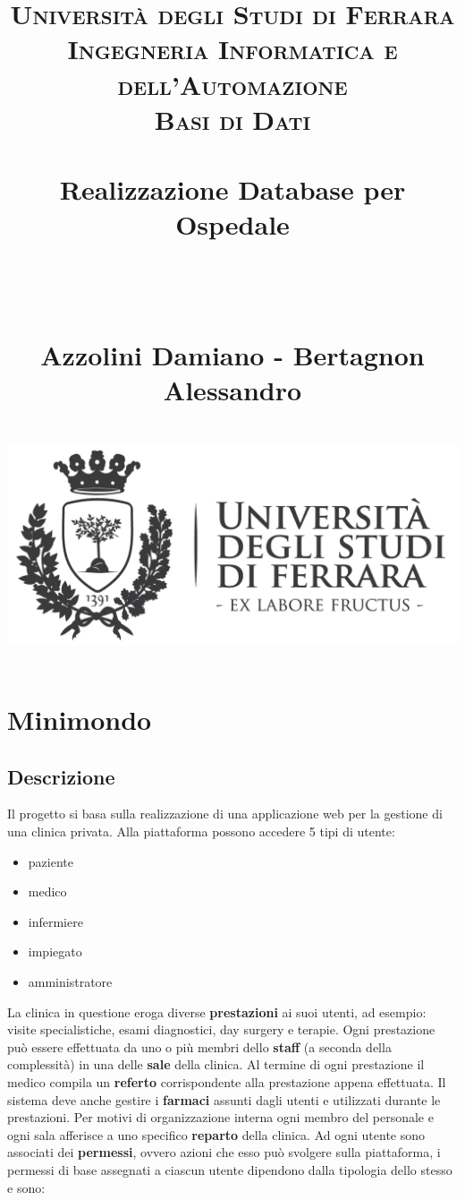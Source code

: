 \documentclass[paper=a4, fontsize=11pt,x11names]{report}
\title{
		\usefont{OT1}{bch}{b}{n}
		\normalfont \normalsize \textsc{Universit\`a degli Studi di Ferrara \\ Ingegneria Informatica e dell'Automazione
			\\ Basi di Dati} \\ [25pt]
		\horrule{0.5pt} \\[0.4cm]
		\Huge Realizzazione Database per Ospedale \date{}\\%
		\horrule{0.5pt} \\[0.4cm]
		\LARGE Azzolini Damiano - Bertagnon Alessandro \\ [0.4cm]
		\horrule{2pt} \\[0.8cm]
		\includegraphics{logoUnife}
}
\begin{document}
\maketitle

\newpage

\tableofcontents
\thispagestyle{empty}



\newpage





\chapter{Minimondo}
\section{Descrizione}
Il progetto si basa sulla realizzazione di una applicazione web per la gestione di una clinica privata. Alla piattaforma possono accedere 5 tipi di utente:
\begin{itemize}
\item paziente
\item medico
\item infermiere
\item impiegato
\item amministratore
\end{itemize}  

La clinica in questione eroga diverse \textbf{prestazioni} ai suoi utenti, ad esempio: visite specialistiche, esami diagnostici, day surgery e terapie. Ogni prestazione può essere effettuata da uno o più membri dello \textbf{staff} (a seconda della complessità) in una delle \textbf{sale} della clinica. Al termine di ogni prestazione il medico compila un \textbf{referto} corrispondente alla prestazione appena effettuata. Il sistema deve anche gestire i \textbf{farmaci} assunti dagli utenti e utilizzati durante le prestazioni. Per motivi di organizzazione interna ogni membro del personale e ogni sala afferisce a uno specifico \textbf{reparto} della clinica. Ad ogni utente sono associati dei \textbf{permessi}, ovvero  azioni che esso può svolgere sulla piattaforma, i permessi di base assegnati a ciascun utente dipendono dalla tipologia dello stesso e sono:\\
\end{document}
